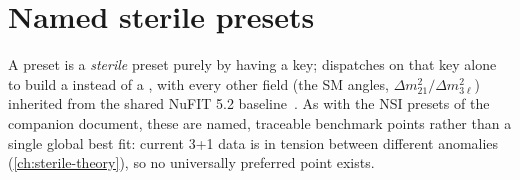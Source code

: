 \label{ch:sterile-observables}

\section{Named sterile presets}
\label{sec:sterile-presets-table}


\begin{implbox}
A preset is a \emph{sterile} preset purely by having a 
key; 
dispatches on that key alone to build a  instead of
a , with every other field (the SM angles,
$\Delta m^2_{21}/\Delta m^2_{3\ell}$) inherited from the shared NuFIT 5.2
baseline~\parencite{Esteban2020NuFit,NuFit52}. As with the NSI presets of
the companion document, these are named, traceable benchmark points rather
than a single global best fit: current 3+1 data is in tension between
different anomalies (\cref{ch:sterile-theory}), so no universally preferred
point exists.


\end{implbox}
